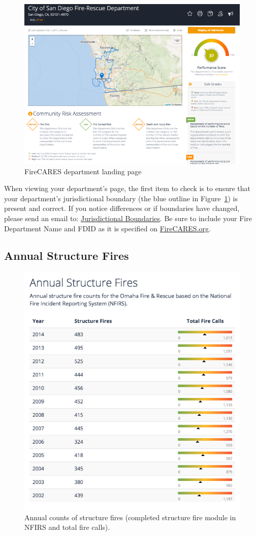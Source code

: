 \documentclass[12pt,oneside]{book}
\begin{document}
\begin{figure}[ht!]
\centering
\includegraphics[width=.9\columnwidth]{Figures/department_page}
\caption{FireCARES department landing page}
\label{fig:department_page}
\end{figure}

When viewing your department's page, the first item to check is to ensure that your department's jurisdictional boundary (the blue outline in Figure~\ref{fig:department_page}) is present and correct. If you notice differences or if boundaries have changed, please send an email to: \href{mailto:boundaries@firecares.org}{Jurisdictional Boundaries}. Be sure to include your Fire Department Name and FDID as it is specified on \href{https://www.FireCARES.org}{FireCARES.org}.


\subsection{Annual Structure Fires}

\begin{figure}[ht!]
\centering
\includegraphics[width=.65\columnwidth]{Figures/structure_fires}
\caption{Annual counts of structure fires (completed structure fire module in NFIRS and total fire calls).}
\label{fig:structure_fires}
\end{figure}
\end{document}
